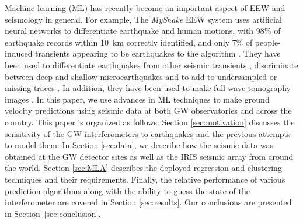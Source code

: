\documentclass[twocolumn, aps, superscriptaddress]{revtex4}
\begin{document}
Machine learning (ML) has recently become an important aspect of EEW and seismology in general. For example,
The \emph{MyShake} EEW system uses artificial neural networks to differentiate earthquake and human motions, with 98\% of earthquake records within 10\, km correctly identified, and only 7\% of people-induced transients appearing to be earthquakes to the algorithm  \cite{KoAl2016}.
They have been used to differentiate earthquakes from other seismic transients \cite{KuYi2011,KoUs2016,PeGh2017}, discriminate between deep and shallow microearthquakes \cite{MoHo2016} and to add to undersampled or missing traces \cite{JiMa2017}. In addition, they have been used to make full-wave tomography images \cite{DiLe2011}. In this paper, we use advances in ML techniques to make ground velocity predictions using seismic data at both GW observatories and across the country.
This paper is organized as follows. Section \ref{sec:motivation} discusses the sensitivity of the GW interferometers to earthquakes and the previous attempts to model them. In Section \ref{sec:data}, we describe how the seismic data was obtained at the GW detector sites as well as the IRIS seismic array from around the world. Section \ref{sec:MLA} describes the deployed regression and clustering techniques and their requirements. Finally, the relative performance of various prediction algorithms along with the ability to guess the state of the interferometer are covered in Section \ref{sec:results}. Our conclusions are presented in Section~\ref{sec:conclusion}.
\end{document}
